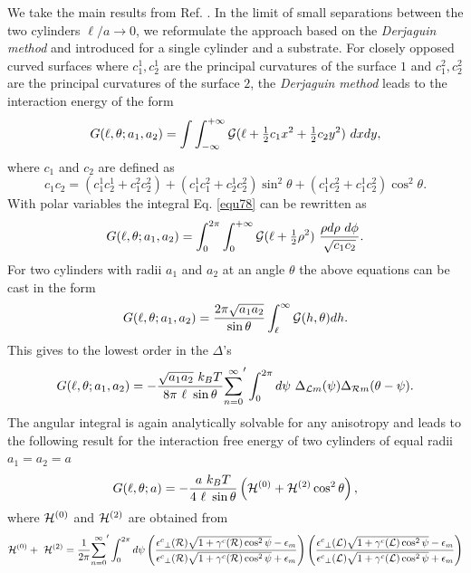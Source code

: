 \documentclass[onecolumn,letterpaper,amsmath,amssymb,floatfix,aps,superscriptaddress]{revtex4}
\begin{document}
We take the main results from Ref. \cite{rick1}. In the limit of small separations between the two cylinders $\ell/a\longrightarrow0$,
we reformulate the approach based on the \emph{Derjaguin} \textsl{method}
and introduced for a single cylinder and a substrate. For closely
opposed curved surfaces where $c_{1}^{1},c_{2}^{1}$ are the principal
curvatures of the surface $1$ and $c_{1}^{2},c_{2}^{2}$ are the
principal curvatures of the surface $2$, the \emph{Derjaguin} \textsl{method}
leads to the interaction energy of the form \begin{equation}
G(\ell,\theta;a_{1},a_{2})=\int\int_{-\infty}^{+\infty}{\cal G}(\ell+{\textstyle \frac{1}{2}}c_{1}x^{2}+{\textstyle \frac{1}{2}}c_{2}y^{2})~dxdy,\label{equ78}\end{equation}
 where $c_{1}$ and $c_{2}$ are defined as \begin{equation}
c_{1}c_{2}=(c_{1}^{1}c_{2}^{1}+c_{1}^{2}c_{2}^{2})+(c_{1}^{1}c_{1}^{2}+c_{2}^{1}c_{2}^{2})\sin^{2}{\theta}+(c_{1}^{1}c_{2}^{2}+c_{1}^{1}c_{2}^{2})\cos^{2}{\theta}.\end{equation}
 With polar variables the integral Eq. \ref{equ78} can be rewritten
as \begin{equation}
G(\ell,\theta;a_{1},a_{2})=\int_{0}^{2\pi}\int_{0}^{+\infty}{\cal G}(\ell+{\textstyle \frac{1}{2}}\rho^{2})~\frac{\rho d\rho~d\phi}{\sqrt{c_{1}c_{2}}}.\end{equation}
 For two cylinders with radii $a_{1}$ and $a_{2}$ at an angle $\theta$
the above equations can be cast in the form \begin{equation}
G(\ell,\theta;a_{1},a_{2})=\frac{2\pi\sqrt{a_{1}a_{2}}}{\sin{\theta}}\int_{\ell}^{{\infty}}{\cal G}(h,\theta)dh.\end{equation}
 This gives to the lowest order in the $\Delta$'s \begin{eqnarray}
G(\ell,\theta;a_{1},a_{2})=-\frac{\sqrt{a_{1}a_{2}}~k_{B}T}{8\pi~\ell~\sin{\theta}}{\sum_{n=0}^{\infty}}'\int_{0}^{2\pi}d\psi~{\Delta_{{\cal L}m}(\psi)\Delta_{{\cal R}m}(\theta-\psi)}.\end{eqnarray}
 The angular
integral is again analytically solvable for any anisotropy and leads
to the following result for the interaction free energy of two cylinders
of equal radii $a_{1}=a_{2}=a$ \begin{equation}
G(\ell,\theta;a)=-\frac{a~k_{B}T}{4~\ell~\sin{\theta}}\left({\cal H}^{(0)}+{\cal H}^{(2)}\cos^{2}{\theta}\right),\end{equation}
 where ${\cal H}^{(0)}$ and ${\cal H}^{(2)}$ are obtained from \begin{equation}
{\cal H}^{(0)}+~{\cal H}^{(2)}=\frac{1}{2\pi}{\sum_{n=0}^{\infty}}'\int_{0}^{2\pi}d\psi\left(\frac{{{\epsilon^{c}}_{\perp}({\cal R})}\sqrt{1+{\gamma^{c}}({\cal R})\cos^{2}{\psi}}-\epsilon_{m}}{{{\epsilon^{c}}_{\perp}({\cal R})}\sqrt{1+{\gamma^{c}}({\cal R})\cos^{2}{\psi}}+\epsilon_{m}}\right)\left(\frac{{{\epsilon^{c}}_{\perp}({\cal L})}\sqrt{1+{\gamma^{c}}({\cal L})\cos^{2}{\psi}}-\epsilon_{m}}{{{\epsilon^{c}}_{\perp}({\cal L})}\sqrt{1+{\gamma^{c}}({\cal L})\cos^{2}{\psi}}+\epsilon_{m}}\right)\label{sutu11}\end{equation}
\end{document}
